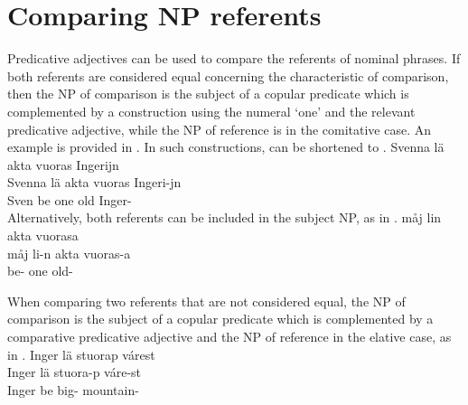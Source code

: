 \section{Comparing NP referents}\label{comparingNPs}
Predicative adjectives can be used to compare the referents of nominal phrases. If both referents are considered equal concerning the characteristic of comparison, then the NP of comparison is the subject of a copular predicate which is complemented by a construction using the numeral  ‘one’ and the relevant predicative adjective, while the NP of reference is in the comitative case. An example is provided in . In such constructions,  can be shortened to . 
\ea\label{comparingNPsEx1}
\glll	Svenna lä akta vuoras Ingerijn\\
	Svenna lä akta vuoras Ingeri-jn\\
	Sven\BS{} be\BS{} one old\BS{} Inger-\\\nopagebreak
{}	%
\z
Alternatively, both referents can be included in the subject NP, as in . %
\ea\label{comparingNPsEx2}
\glll	måj lin akta vuorasa\\
	måj li-n akta vuoras-a\\
	 be- one old-\\\nopagebreak
{}	
\z

When comparing two referents that are not considered equal, the NP of comparison is the subject of a copular predicate which is complemented by a comparative predicative adjective and the NP of reference in the elative case, as in . %
\ea\label{comparingNPsEx3}
\glll	Inger lä stuorap várest\\
	Inger lä stuora-p váre-st\\
	Inger\BS{} be\BS{} big-\BS{} mountain-\\\nopagebreak
{}	
\z

